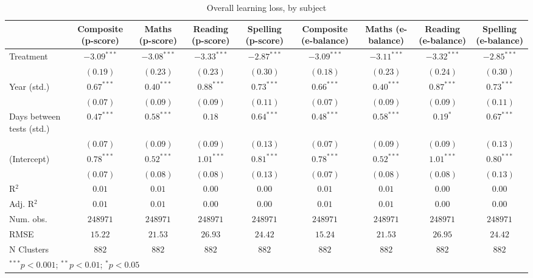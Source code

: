 
\begin{table}
\begin{center}
\begin{tabular}{l c c c c c c c c}
\hline
 & Composite (p-score) & Maths (p-score) & Reading (p-score) & Spelling (p-score) & Composite (e-balance) & Maths (e-balance) & Reading (e-balance) & Spelling (e-balance) \\
\hline
Treatment                 & $-3.09^{***}$ & $-3.08^{***}$ & $-3.33^{***}$ & $-2.87^{***}$ & $-3.09^{***}$ & $-3.11^{***}$ & $-3.32^{***}$ & $-2.85^{***}$ \\
                          & $(0.19)$      & $(0.23)$      & $(0.23)$      & $(0.30)$      & $(0.18)$      & $(0.23)$      & $(0.24)$      & $(0.30)$      \\
Year (std.)               & $0.67^{***}$  & $0.40^{***}$  & $0.88^{***}$  & $0.73^{***}$  & $0.66^{***}$  & $0.40^{***}$  & $0.87^{***}$  & $0.73^{***}$  \\
                          & $(0.07)$      & $(0.09)$      & $(0.09)$      & $(0.11)$      & $(0.07)$      & $(0.09)$      & $(0.09)$      & $(0.11)$      \\
Days between tests (std.) & $0.47^{***}$  & $0.58^{***}$  & $0.18$        & $0.64^{***}$  & $0.48^{***}$  & $0.58^{***}$  & $0.19^{*}$    & $0.67^{***}$  \\
                          & $(0.07)$      & $(0.09)$      & $(0.09)$      & $(0.13)$      & $(0.07)$      & $(0.09)$      & $(0.09)$      & $(0.13)$      \\
(Intercept)               & $0.78^{***}$  & $0.52^{***}$  & $1.01^{***}$  & $0.81^{***}$  & $0.78^{***}$  & $0.52^{***}$  & $1.01^{***}$  & $0.80^{***}$  \\
                          & $(0.07)$      & $(0.08)$      & $(0.08)$      & $(0.13)$      & $(0.07)$      & $(0.08)$      & $(0.08)$      & $(0.13)$      \\
\hline
R$^2$                     & $0.01$        & $0.01$        & $0.00$        & $0.00$        & $0.01$        & $0.01$        & $0.00$        & $0.00$        \\
Adj. R$^2$                & $0.01$        & $0.01$        & $0.00$        & $0.00$        & $0.01$        & $0.01$        & $0.00$        & $0.00$        \\
Num. obs.                 & $248971$      & $248971$      & $248971$      & $248971$      & $248971$      & $248971$      & $248971$      & $248971$      \\
RMSE                      & $15.22$       & $21.53$       & $26.93$       & $24.42$       & $15.24$       & $21.53$       & $26.95$       & $24.42$       \\
N Clusters                & $882$         & $882$         & $882$         & $882$         & $882$         & $882$         & $882$         & $882$         \\
\hline
\multicolumn{9}{l}{\scriptsize{$^{***}p<0.001$; $^{**}p<0.01$; $^{*}p<0.05$}}
\end{tabular}
\caption{Overall learning loss, by subject}
\label{table:overall_match}
\end{center}
\end{table}
